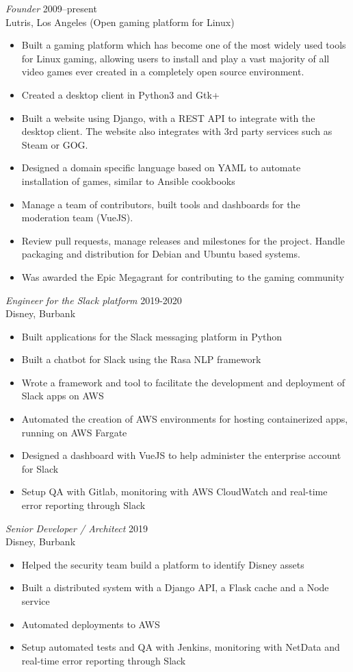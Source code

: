 \documentclass[line,resmargin]{res}
\begin{document}
\begin{resume}
{\sl Founder\/} \hfill 2009--present\\
Lutris, Los Angeles (Open gaming platform for Linux)
\begin{itemize} \itemsep -2pt
\item Built a gaming platform which has become one of the most widely used tools for Linux gaming, allowing users to install and play a vast majority of all video games ever created in a completely open source environment.
\item Created a desktop client in Python3 and Gtk+
\item Built a website using Django, with a REST API to integrate with the desktop client. The website also integrates with 3rd party services such as Steam or GOG.
\item Designed a domain specific language based on YAML to automate installation of games, similar to Ansible cookbooks
\item Manage a team of contributors, built tools and dashboards for the moderation team (VueJS).
\item Review pull requests, manage releases and milestones for the project. Handle packaging and distribution for Debian and Ubuntu based systems.
\item Was awarded the Epic Megagrant for contributing to the gaming community
\end{itemize}

{\sl Engineer for the Slack platform\/} \hfill 2019-2020\\
Disney, Burbank
\begin{itemize} \itemsep -2pt
\item Built applications for the Slack messaging platform in Python
\item Built a chatbot for Slack using the Rasa NLP framework
\item Wrote a framework and tool to facilitate the development and deployment of Slack apps on AWS
\item Automated the creation of AWS environments for hosting containerized apps, running on AWS Fargate
\item Designed a dashboard with VueJS to help administer the enterprise account for Slack
\item Setup QA with Gitlab, monitoring with AWS CloudWatch and real-time error reporting through Slack
\end{itemize}

{\sl Senior Developer / Architect\/} \hfill 2019\\
Disney, Burbank
\begin{itemize} \itemsep -2pt
\item Helped the security team build a platform to identify Disney assets
\item Built a distributed system with a Django API, a Flask cache and a Node service
\item Automated deployments to AWS
\item Setup automated tests and QA with Jenkins, monitoring with NetData and real-time error reporting through Slack
\end{itemize}


\end{resume}
\end{document}
